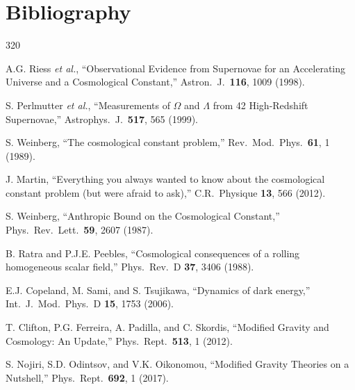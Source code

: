 
\chapter*{Bibliography}

\small
\begin{thebibliography}{320}


A.G. Riess \textit{et al.},
``Observational Evidence from Supernovae for an Accelerating Universe and a Cosmological Constant,''
Astron.\ J.\ \textbf{116}, 1009 (1998).

S. Perlmutter \textit{et al.},
``Measurements of $\Omega$ and $\Lambda$ from 42 High-Redshift Supernovae,''
Astrophys.\ J.\ \textbf{517}, 565 (1999).

S. Weinberg,
``The cosmological constant problem,''
Rev.\ Mod.\ Phys.\ \textbf{61}, 1 (1989).

J. Martin,
``Everything you always wanted to know about the cosmological constant problem (but were afraid to ask),''
C.R.\ Physique \textbf{13}, 566 (2012).

S. Weinberg,
``Anthropic Bound on the Cosmological Constant,''
Phys.\ Rev.\ Lett.\ \textbf{59}, 2607 (1987).

B. Ratra and P.J.E. Peebles,
``Cosmological consequences of a rolling homogeneous scalar field,''
Phys.\ Rev.\ D \textbf{37}, 3406 (1988).

E.J. Copeland, M. Sami, and S. Tsujikawa,
``Dynamics of dark energy,''
Int.\ J.\ Mod.\ Phys.\ D \textbf{15}, 1753 (2006).

T. Clifton, P.G. Ferreira, A. Padilla, and C. Skordis,
``Modified Gravity and Cosmology: An Update,''
Phys.\ Rept.\ \textbf{513}, 1 (2012).

S. Nojiri, S.D. Odintsov, and V.K. Oikonomou,
``Modified Gravity Theories on a Nutshell,''
Phys.\ Rept.\ \textbf{692}, 1 (2017).


\end{thebibliography}
